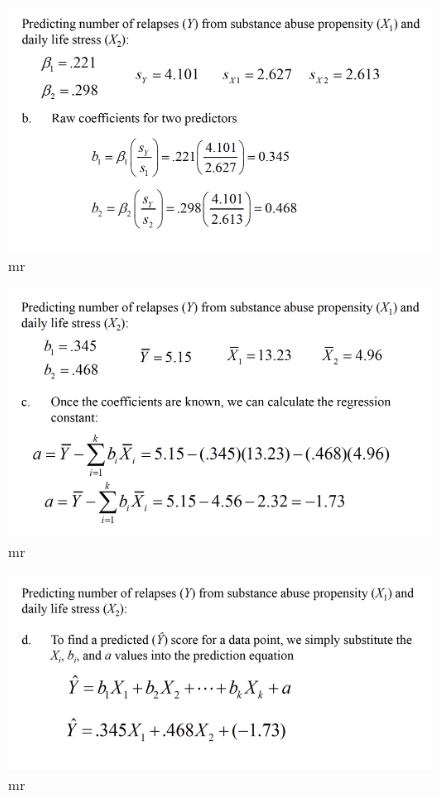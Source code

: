 \documentclass[]{book}
\theoremstyle{definition}
\theoremstyle{definition}
\theoremstyle{definition}
\theoremstyle{remark}
\begin{document}
\begin{figure}
\centering
\includegraphics{img/hicksmr5.png}
\caption{mr}
\end{figure}

\begin{figure}
\centering
\includegraphics{img/hicksmr6.png}
\caption{mr}
\end{figure}

\begin{figure}
\centering
\includegraphics{img/hicksmr7.png}
\caption{mr}
\end{figure}
\end{document}
